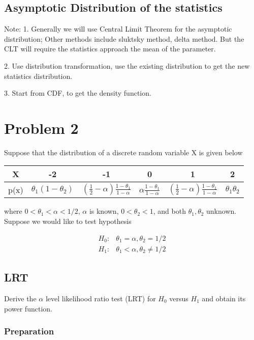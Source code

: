 \subsection{Asymptotic Distribution of the statistics}
\begin{mdframed}
Note: 
1. Generally we will use Central Limit Theorem for the asymptotic distribution; Other methods include sluktsky method, delta method. But the CLT will require the statistics approach the mean of the parameter. 

2. Use distribution transformation, use the existing distribution to get the new statistics distribution. 

3. Start from CDF, to get the density function.
\end{mdframed}


\section{Problem 2}
Suppose that the distribution of a discrete random variable X is given below

\begin{center}
\begin{tabular}{ c c c c c c}
 X & -2 & -1 & 0 & 1 & 2 \\ 
 \hline
p(x) & $\theta_1(1-\theta_2)$ & $(\frac{1}{2} - \alpha) \frac{1-\theta_1}{1-\alpha} $ & $ \alpha \frac{1-\theta_1}{1-\alpha} $ & $(\frac{1}{2} - \alpha) \frac{1-\theta_1}{1-\alpha}$ & $ \theta_1 \theta_2$ \\  
\end{tabular}
\end{center}

 where $0< \theta_1 < \alpha < 1/2$, $\alpha$ is known, $0< \theta_2 < 1$, and both $\theta_1, \theta_2$ unknown. Suppose we would like to test hypothesis

\begin{align*}
	H_0: &  \theta_1 = \alpha, \theta_2 = 1/2 \\
	H_1: &  \theta_1 < \alpha, \theta_2  \neq 1/2
\end{align*} 

\subsection{LRT }

Derive the $\alpha$ level likelihood ratio test (LRT) for $H_0$ versus $H_1$ and obtain its power function.


\subsubsection{Preparation}


